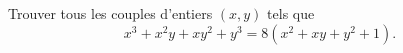 Trouver tous les couples d'entiers $(x, y)$ tels que
\[ x^3 + x^2y + xy^2 + y^3 = 8(x^2 + xy + y^2 + 1). \]
